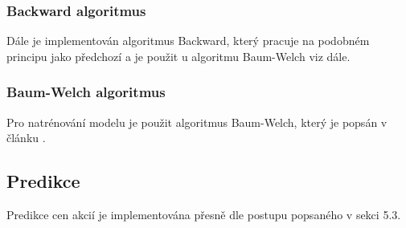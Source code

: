 \subsubsection{Backward algoritmus}
Dále je implementován algoritmus Backward, který pracuje na podobném principu jako předchozí a je použit u algoritmu Baum-Welch viz dále.

\subsubsection{Baum-Welch algoritmus}
Pro natrénování modelu je použit algoritmus Baum-Welch, který je popsán v článku \cite{Nguyen}.

\subsection{Predikce}
Predikce cen akcií je implementována přesně dle postupu popsaného v sekci 5.3.

\clearpage
